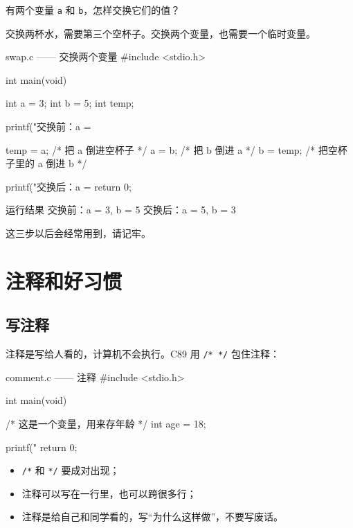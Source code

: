 \begin{example}
有两个变量 \texttt{a} 和 \texttt{b}，怎样交换它们的值？
\end{example}
\begin{solution}
交换两杯水，需要第三个空杯子。交换两个变量，也需要一个临时变量。

\begin{codebox}{swap.c —— 交换两个变量}
#include <stdio.h>

int main(void)
{
    int a = 3;
    int b = 5;
    int temp;

    printf("交换前：a = %

    temp = a;       /* 把 a 倒进空杯子 */
    a = b;          /* 把 b 倒进 a */
    b = temp;       /* 把空杯子里的 a 倒进 b */

    printf("交换后：a = %
    return 0;
}
\end{codebox}

\begin{outbox}{运行结果}
交换前：a = 3, b = 5
交换后：a = 5, b = 3
\end{outbox}

这三步以后会经常用到，请记牢。
\end{solution}

\section{注释和好习惯}

\subsection{写注释}

注释是写给人看的，计算机不会执行。C89 用 \texttt{/* */} 包住注释：

\begin{codebox}{comment.c —— 注释}
#include <stdio.h>

int main(void)
{
    /* 这是一个变量，用来存年龄 */
    int age = 18;

    printf("%
    return 0;
}
\end{codebox}

\begin{itemize}
  \item \texttt{/*} 和 \texttt{*/} 要成对出现；
  \item 注释可以写在一行里，也可以跨很多行；
  \item 注释是给自己和同学看的，写“为什么这样做”，不要写废话。
\end{itemize}

